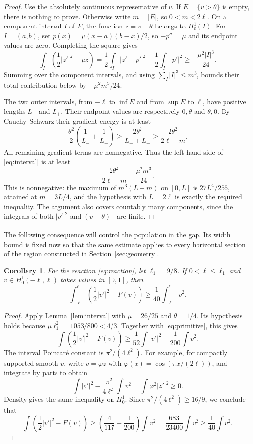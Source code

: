 \documentclass[11pt]{article}
\newtheorem{corollary}[theorem]{Corollary}
\begin{document}
\begin{proof}
Use the absolutely continuous representative of \(v\). If
\(E=\{v>\theta\}\) is empty, there is nothing to prove. Otherwise write
\(m=|E|\), so \(0<m<2\ell\). On a component interval \(I\) of \(E\),
the function \(z=v-\theta\) belongs to \(H^1_0(I)\).
For \(I=(a,b)\), set \(p(x)=\mu(x-a)(b-x)/2\), so \(-p''=\mu\) and its endpoint values are zero.
Completing the square gives
\[
 \int_I\left(\frac12|z'|^2-\mu z\right)
 =\frac12\int_I|z'-p'|^2-\frac12\int_I|p'|^2
 \ge-\frac{\mu^2|I|^3}{24}.
\]
Summing over the component intervals, and using
\(\sum_I|I|^3\le m^3\), bounds their total contribution below by
\(-\mu^2m^3/24\).

The two outer intervals, from \(-\ell\) to \(\inf E\) and from
\(\sup E\) to \(\ell\), have positive lengths \(L_-\) and \(L_+\).
Their endpoint values are respectively \(0,\theta\) and \(\theta,0\).
By Cauchy--Schwarz their gradient energy is at least
\[
 \frac{\theta^2}{2}\left(\frac1{L_-}+\frac1{L_+}\right)
 \ge\frac{2\theta^2}{L_-+L_+}
 \ge\frac{2\theta^2}{2\ell-m}.
\]
All remaining gradient terms are nonnegative. Thus the left-hand side of
\eqref{eq:interval} is at least
\[
 \frac{2\theta^2}{2\ell-m}-\frac{\mu^2m^3}{24}.
\]
This is nonnegative: the maximum of \(m^3(L-m)\) on \([0,L]\) is
\(27L^4/256\), attained at \(m=3L/4\), and the hypothesis with
\(L=2\ell\) is exactly the required inequality.
The argument also covers countably many components, since the integrals
of both \(|v'|^2\) and \((v-\theta)_+\) are finite.
\end{proof}

The following consequence will control the population in the gap. Its
width bound is fixed now so that the same estimate applies to every
horizontal section of the region constructed in Section~\ref{sec:geometry}.

\begin{corollary}\label{cor:coercive}
For the reaction \eqref{eq:reaction}, let \(\ell_1=9/8\).
If \(0<\ell\le\ell_1\) and \(v\in H^1_0(-\ell,\ell)\) takes values in
\([0,1]\), then
\begin{equation}\label{eq:coercive}
 \int_{-\ell}^{\ell}\left(\frac12|v'|^2-F(v)\right)
 \ge\frac1{40}\int_{-\ell}^{\ell}v^2.
\end{equation}
\end{corollary}

\begin{proof}
Apply Lemma~\ref{lem:interval} with \(\mu=26/25\) and
\(\theta=1/4\). Its hypothesis holds because
\(\mu\ell_1^2=1053/800<4/3\).
Together with \eqref{eq:primitive}, this gives
\[
 \int\left(\frac12|v'|^2-F(v)\right)
 \ge\frac1{52}\int|v'|^2-\frac1{200}\int v^2.
\]
The interval Poincar\'e constant is \(\pi^2/(4\ell^2)\).
For example, for compactly supported smooth \(v\), write
\(v=\varphi z\) with \(\varphi(x)=\cos(\pi x/(2\ell))\), and integrate
by parts to obtain
\[
 \int|v'|^2-\frac{\pi^2}{4\ell^2}\int v^2
 =\int\varphi^2|z'|^2\ge0.
\]
Density gives the same inequality on \(H^1_0\). Since
\(\pi^2/(4\ell^2)\ge16/9\), we conclude that
\[
 \int\left(\frac12|v'|^2-F(v)\right)
 \ge\left(\frac4{117}-\frac1{200}\right)\int v^2
 =\frac{683}{23400}\int v^2
 \ge\frac1{40}\int v^2.
\]
\end{proof}
\end{document}
